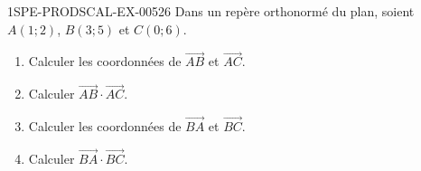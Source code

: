 \begin{exercice}{1SPE-PRODSCAL-EX-005}{2}{6}
Dans un repère orthonormé du plan, soient $A(1; 2)$, $B(3; 5)$ et $C(0; 6)$.
\begin{enumerate}
  \item Calculer les coordonnées de $\overrightarrow{AB}$ et $\overrightarrow{AC}$.
  \item Calculer $\overrightarrow{AB} \cdot \overrightarrow{AC}$.
  \item Calculer les coordonnées de $\overrightarrow{BA}$ et $\overrightarrow{BC}$.
  \item Calculer $\overrightarrow{BA} \cdot \overrightarrow{BC}$.
\end{enumerate}
\end{exercice}
